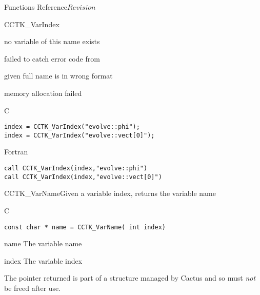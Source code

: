 \begin{cactuspart}{ Functions Reference}{}{$Revision$}
\begin{FunctionDescription}{CCTK\_VarIndex}{}
\begin{ErrorSection}
\begin{Error}{-1}
no variable of this name exists
\end{Error}
\begin{Error}{-2}
failed to catch error code from 
\end{Error}
\begin{Error}{-3}
given full name is in wrong format
\end{Error}
\begin{Error}{-4}
memory allocation failed
\end{Error}
\end{ErrorSection}
\begin{ExampleSection}
\begin{Example}{C}
\begin{verbatim}
index = CCTK_VarIndex("evolve::phi");
index = CCTK_VarIndex("evolve::vect[0]");
\end{verbatim}
\end{Example}
\begin{Example}{Fortran}
\begin{verbatim}
call CCTK_VarIndex(index,"evolve::phi")
call CCTK_VarIndex(index,"evolve::vect[0]")
\end{verbatim}
\end{Example}
\end{ExampleSection}
\end{FunctionDescription}


\begin{FunctionDescription}{CCTK\_VarName}{Given a variable index, returns the variable name}
\label{CCTK-VarName}
\begin{SynopsisSection}
\begin{Synopsis}{C}
\begin{verbatim}const char * name = CCTK_VarName( int index)\end{verbatim}
\end{Synopsis}
\end{SynopsisSection}
\begin{ParameterSection}
\begin{Parameter}{name}
The variable name
\end{Parameter}
\begin{Parameter}{index}
The variable index
\end{Parameter}
\end{ParameterSection}
\begin{Discussion}
The pointer returned is part of a structure managed by Cactus
and so must {\em not} be freed after use.


\end{Discussion}
\end{FunctionDescription}
\end{cactuspart}
